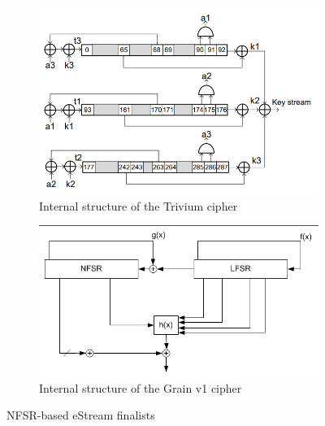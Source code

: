 \begin{description}
\begin{figure}[h]
			\begin{subfigure}{0.5\textwidth}
				\includegraphics[width=1\textwidth]{trivium.png} 
				\caption{Internal structure of the Trivium cipher}
				\label{fig:trivium}
			\end{subfigure}
			\begin{subfigure}{0.5\textwidth}
				\includegraphics[width=1\textwidth]{grainv1.png} 
				\caption{Internal structure of the Grain v1 cipher}
				\label{fig:grainv1}
			\end{subfigure}
			
			\caption{NFSR-based eStream finalists}
			\label{fig:nfsr}
			
		\end{figure}
		

\end{description}
